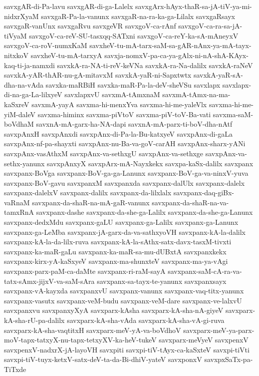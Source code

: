 {savxgAR-di-Pa-lavu
savxgAR-di-ga-Lalelx
savxgArx-hAyx-thaR-sa-jA-tiV-ya-mi-nidxrXyaM
savxgaR-Pa-la-vanunx
savxgaR-na-ra-ka-ga-Lilalx
savxgaRsayx
savxgaR-vanUnx
savxgaRvu
savxgeVR
savxgoV-ca-rAnf
savxgoV-ca-ra-sa-jA-tiVyaM
savxgoV-ca-reV-SU-tasxqq-SATxni
savxgoV-ca-reY-ka-sA-mAneyxV
savxgoV-ca-roV-numxKaM
savxheV-tu-mA-tarx-saM-sa-gAR-nAnx-ya-mA-tayx-nitxkoV
savxheV-tu-mA-tarxyA
savxja-nomxV-pa-ca-ya-gAlx-ni-nA-shA-KAyx-kaq-ti-ja-namxdi
savxkA-ra-NA-ti-reV-keVNa
savxkA-ra-Na-dalilx
savxkA-raNeV
savxkA-yAR-thAR-nu-gA-mitavxM
savxkA-yaR-ni-Sapxtwtx
savxkA-yaR-sA-dha-na-vAda
savxka-maRBiH
savxka-maR-Pa-la-deV-sheVSu
savxlapx
savxlapx-di-na-ga-La-lilxyeV
savxlapxvU
savxmA-tAmxnaM
savxmA-tAmx-na-ma-kaSxreV
savxmA-yayA
savxma-hi-menxYva
savxma-hi-me-yaleVlx
savxma-hi-me-yiM-daleV
savxma-himinx
savxma-piVtoV
savxma-piV-toV-Ba-vati
savxma-saM-boVdhaM
savxnA-mA-garx-ha-NA-dapi
savxnA-mA-parx-ti-boV-dha-nAtf
savxpAnxH
savxpAnxdi
savxpAnx-di-Pa-la-Bu-katxyeV
savxpAnx-di-gaLa
savxpAnx-nf-pa-shayxti
savxpAnx-nu-Ba-va-goV-carAH
savxpAnx-sharx-yANi
savxpAnx-vasAthxM
savxpAnx-va-sethxgU
savxpAnx-va-sethxge
savxpAnx-va-sethx-yanunx
savxpAnxyX
savxpArx-mA-Nayxkekx
savxpa-kaSx-dalilx
savxpanx
savxpanx-BoVga
savxpanx-BoV-ga-ga-Lanunx
savxpanx-BoV-ga-va-ninxV-yuva
savxpanx-BoV-gavu
savxpanxM
savxpanxda
savxpanx-dalUlx
savxpanx-dalelx
savxpanx-dalelxV
savxpanx-dalilx
savxpanx-da-lilxlalx
savxpanx-daq-giBx-vaRnaM
savxpanx-da-shaR-na-mA-gaR-vanunx
savxpanx-da-shaR-na-va-tamxRnA
savxpanx-dashe
savxpanx-da-she-ga-Lalilx
savxpanx-da-she-ga-Lanunx
savxpanx-dedxMdu
savxpanx-gaLU
savxpanx-ga-Lalilx
savxpanx-ga-Lanunx
savxpanx-ga-LeMba
savxpanx-jA-garx-da-va-sathxyoVH
savxpanx-kA-la-dalilx
savxpanx-kA-la-da-lilx-ruva
savxpanx-kA-la-sAthx-satx-davx-tasxM-tivxti
savxpanx-ka-maR-gaLu
savxpanx-ka-maR-sa-mu-dUBxtA
savxpanxkekx
savxpanx-kirx-yA-kaSxyeV
savxpanx-ma-shunxteV
savxpanx-ma-ya-vAgi
savxpanx-parx-paM-ca-daMte
savxpanx-ri-raM-sayA
savxpanx-saM-cA-ra-va-tatx-sAmx-jijxV-va-saM-sAra
savxpanx-sa-tayx-te-yanunx
savxpanxsayx
savxpanx-vA-kayxda
savxpanxvU
savxpanx-vanunx
savxpanx-vaq-titx-yanunx
savxpanx-vasutx
savxpanx-veM-budu
savxpanx-veM-dare
savxpanx-ve-lalxvU
savxpanxvu
savxpanxyXyA
savxparx-kAsha
savxparx-kA-sha-nA-giyeV
savxparx-kA-sha-rU-pa-dalilx
savxparx-kA-sha-vAda
savxparx-kA-sha-vA-gi-ruva
savxparx-kA-sha-vaqtitxH
savxparx-meV-yA-va-boVdhoV
savxparx-meV-ya-parx-moV-tapx-tatxyX-nu-tapx-tetxyXV-ka-heV-tukeV
savxparx-meVyeV
savxpenxV
savxpenxV-nadxrX-jA-layoVH
savxpiti
savxpi-tiV-tAyx-ca-kaSxteV
savxpi-tiVti
savxpi-tiV-tuyx-ketxV-satx-deV-ta-da-Bi-dhiV-yateV
savxponxV
savxpxSaTx-pa-TiTxde
}
